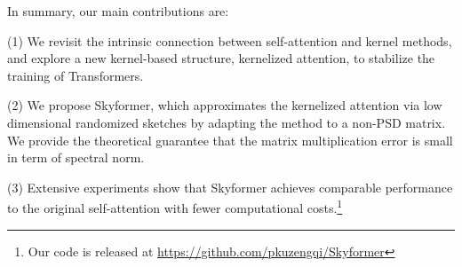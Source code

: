 In summary, our main contributions are:


(1) We revisit the intrinsic connection between self-attention and kernel methods, and explore a new kernel-based structure, kernelized attention, to stabilize the training of Transformers.


(2) We propose Skyformer, which approximates the kernelized attention via low dimensional randomized sketches by adapting the \nystrom method to a non-PSD matrix. 
We provide the theoretical guarantee that the matrix multiplication error is small in term of spectral norm. 


(3) Extensive experiments show that Skyformer achieves comparable performance to the original self-attention with fewer computational costs.\footnote{Our code is released at \url{https://github.com/pkuzengqi/Skyformer}}











